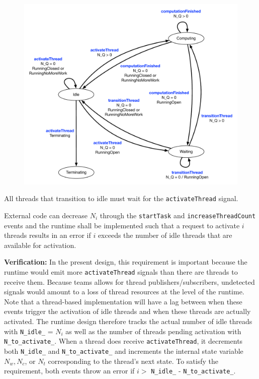 \documentclass{article}
\begin{document}
\begin{figure}[!hp]
\begin{center}
\includegraphics[width=6.5in]{ThreadStatesPersistent.pdf}
\caption[]{}
\label{fig:ThreadStateDiagram}
\end{center}
\end{figure}

\begin{req}
All threads that transition to idle must wait for the \texttt{activateThread}
signal.
\label{req:IdleActivateThread}
\end{req}

\begin{req}
External code can decrease $N_i$ through the \texttt{startTask} and
\texttt{increaseThreadCount} events and the runtime shall be implemented such
that a request to activate $i$ threads results in an error if $i$ exceeds the
number of idle threads that are available for activation.
\end{req}
\textbf{Verification:}\hspace{0.125in}  In the present design, this requirement
is important because the runtime would emit more \texttt{activateThread} signals
than there are threads to receive them.  Because teams allows for thread
publishers/subscribers, undetected signals would amount to a loss of thread
resources at the level of the runtime.  Note that a thread-based implementation
will have a lag between when these events trigger the activation of idle threads
and when these threads are actually activated.  The runtime design therefore
tracks the actual number of idle threads with \texttt{N\_idle\_} = $N_i$ as well
as the number of threads pending activation with \texttt{N\_to\_activate\_}.
When a thread does receive \texttt{activateThread}, it decrements both
\texttt{N\_idle\_} and \texttt{N\_to\_activate\_} and increments the internal
state variable $N_w, N_c$, or $N_t$ corresponding to the thread's next state.
To satisfy the requirement, both events throw an error if $i > $
\texttt{N\_idle\_} - \texttt{N\_to\_activate\_}.
\end{document}
